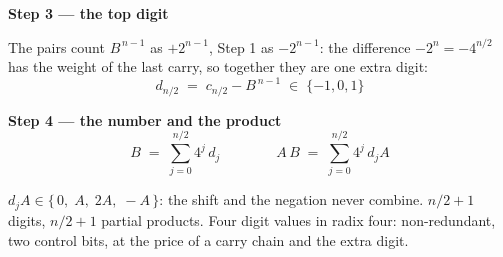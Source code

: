 \documentclass[fleqn]{article}
\begin{document}
\noindent\textbf{Step 3 --- the top digit}

\noindent The pairs count $B^{\,n-1}$ as $+2^{n-1}$, Step 1 as $-2^{n-1}$: the difference
$-2^{n} = -4^{n/2}$ has the weight of the last carry, so together they are one extra digit:
\[
d_{n/2} \;=\; c_{n/2} - B^{\,n-1} \;\in\; \{-1, 0, 1\}
\]

\vspace{0.5em}

\noindent\textbf{Step 4 --- the number and the product}
\[
B \;=\; \sum_{j=0}^{n/2} 4^{j} \, d_j
\qquad\qquad
A \, B \;=\; \sum_{j=0}^{n/2} 4^{j} \, d_j A
\]

\noindent $d_j A \in \{\, 0,\; A,\; 2A,\; -A \,\}$: the shift and the negation never combine.
$n/2 + 1$ digits, $n/2 + 1$ partial products. Four digit values in radix four:
non-redundant, two control bits, at the price of a carry chain and the extra digit.
\end{document}
